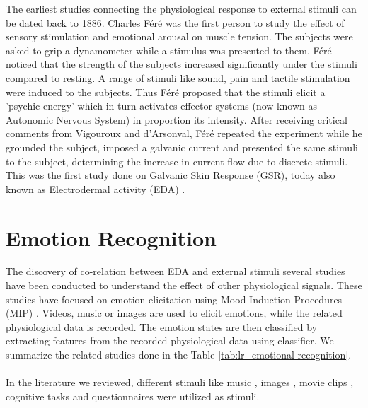 
The earliest studies connecting the physiological response to external stimuli can be dated back to 1886. Charles F\'er\'e was the first person to study the effect of sensory stimulation and emotional arousal on muscle tension. The subjects were asked to grip a dynamometer while a stimulus was presented to them. F\'er\'e noticed that the strength of the subjects increased significantly under the stimuli compared to resting. A range of stimuli like sound, pain and tactile stimulation were induced to the subjects. Thus F\'er\'e proposed that the stimuli elicit a 'psychic energy' which in turn activates effector systems (now known as Autonomic Nervous System) in proportion its intensity. After receiving critical comments from Vigouroux and d'Arsonval, F\'er\'e repeated the experiment while he grounded the subject, imposed a galvanic current and presented the same stimuli to the subject, determining the increase in current flow due to discrete stimuli. This was the first study done on Galvanic Skin Response (GSR), today also known as Electrodermal activity (EDA) \cite{neumann_early_1970}.

\section{Emotion Recognition} \label{sec:emo_rec} The discovery of co-relation between EDA and external stimuli several studies have been conducted to understand the effect of other physiological signals. These studies have focused on emotion elicitation using Mood Induction Procedures (MIP) \cite{gross_emotion_1995}. Videos, music or images are used to elicit emotions, while the related physiological data is recorded. The emotion states are then classified by extracting features from the recorded physiological data using classifier. We summarize the related studies done in the Table \ref{tab:lr_emotional recognition}.

\paragraph{} In the literature we reviewed, different stimuli like music \cite{kim_emotion_2008} , images \cite{kanade_emotion_2004} \cite{kordic_emotion_2010}, movie clips \cite{lisetti_using_2004} \cite{wan_wen_2009} \cite{schulze_cnn_2016}, cognitive tasks and questionnaires \cite{grimm_bimodal_2007} were utilized as stimuli. 

